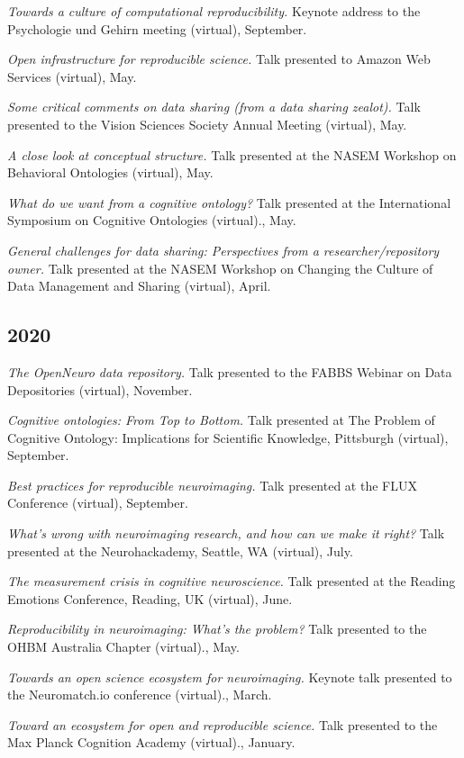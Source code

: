 \documentclass[10pt, letterpaper]{article}
\begin{document}
\textit{Towards a culture of computational reproducibility.} Keynote address to the Psychologie und Gehirn meeting (virtual), September.

\textit{Open infrastructure for reproducible science.} Talk presented to Amazon Web Services (virtual), May.

\textit{Some critical comments on data sharing (from a data sharing zealot).} Talk presented to the Vision Sciences Society Annual Meeting (virtual), May.

\textit{A close look at conceptual structure.} Talk presented at the NASEM Workshop on Behavioral Ontologies (virtual), May.

\textit{What do we want from a cognitive ontology?} Talk presented at the International Symposium on Cognitive Ontologies (virtual)., May.

\textit{General challenges for data sharing: Perspectives from a researcher/repository owner.} Talk presented at the NASEM Workshop on Changing the Culture of Data Management and Sharing (virtual), April.

\subsection*{2020}\textit{The OpenNeuro data repository.} Talk presented to the FABBS Webinar on Data Depositories (virtual), November.

\textit{Cognitive ontologies: From Top to Bottom.} Talk presented at The Problem of Cognitive Ontology: Implications for Scientific Knowledge, Pittsburgh (virtual), September.

\textit{Best practices for reproducible neuroimaging.} Talk presented at the FLUX Conference (virtual), September.

\textit{What's wrong with neuroimaging research, and how can we make it right?} Talk presented at the Neurohackademy, Seattle, WA (virtual), July.

\textit{The measurement crisis in cognitive neuroscience.} Talk presented at the Reading Emotions Conference, Reading, UK (virtual), June.

\textit{Reproducibility in neuroimaging: What's the problem?} Talk presented to the OHBM Australia Chapter (virtual)., May.

\textit{Towards an open science ecosystem for neuroimaging.} Keynote talk presented to the Neuromatch.io conference (virtual)., March.

\textit{Toward an ecosystem for open and reproducible science.} Talk presented to the Max Planck Cognition Academy (virtual)., January.
\end{document}
